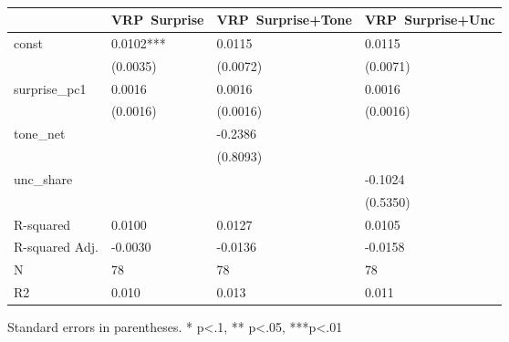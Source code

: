 \begin{table}
\caption{}
\label{}
\begin{center}
\begin{tabular}{llll}
\hline
               & VRP~Surprise & VRP~Surprise+Tone & VRP~Surprise+Unc  \\
\hline
const          & 0.0102***    & 0.0115            & 0.0115            \\
               & (0.0035)     & (0.0072)          & (0.0071)          \\
surprise\_pc1  & 0.0016       & 0.0016            & 0.0016            \\
               & (0.0016)     & (0.0016)          & (0.0016)          \\
tone\_net      &              & -0.2386           &                   \\
               &              & (0.8093)          &                   \\
unc\_share     &              &                   & -0.1024           \\
               &              &                   & (0.5350)          \\
R-squared      & 0.0100       & 0.0127            & 0.0105            \\
R-squared Adj. & -0.0030      & -0.0136           & -0.0158           \\
N              & 78           & 78                & 78                \\
R2             & 0.010        & 0.013             & 0.011             \\
\hline
\end{tabular}
\end{center}
\end{table}
\bigskip
Standard errors in parentheses. \newline 
* p<.1, ** p<.05, ***p<.01